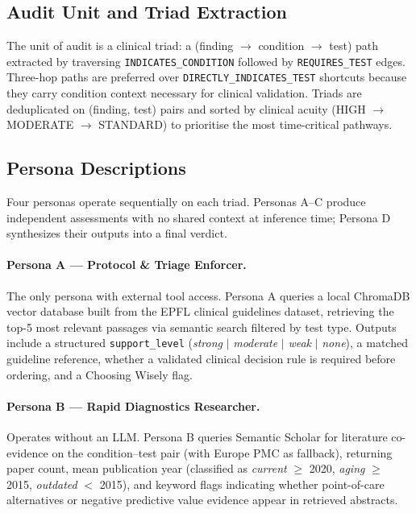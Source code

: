 \documentclass[pmlr]{jmlr}%
\begin{document}
\subsection*{Audit Unit and Triad Extraction}
The unit of audit is a clinical triad: a (finding $\rightarrow$ condition $\rightarrow$
test) path extracted by traversing \texttt{INDICATES\_CONDITION} followed by
\texttt{REQUIRES\_TEST} edges. Three-hop paths are preferred over
\texttt{DIRECTLY\_INDICATES\_TEST} shortcuts because they carry condition context
necessary for clinical validation. Triads are deduplicated on (finding, test) pairs and
sorted by clinical acuity (HIGH $\rightarrow$ MODERATE $\rightarrow$ STANDARD) to
prioritise the most time-critical pathways.

\subsection*{Persona Descriptions}
Four personas operate sequentially on each triad. Personas A--C produce independent
assessments with no shared context at inference time; Persona D synthesizes their outputs
into a final verdict.

\paragraph{Persona A — Protocol \& Triage Enforcer.}
The only persona with external tool access. Persona A queries a local ChromaDB vector database built from the EPFL clinical guidelines dataset, retrieving the top-5 most relevant passages via semantic search filtered by test type. Outputs include a structured \texttt{support\_level} (\textit{strong} $|$ \textit{moderate} $|$ \textit{weak} $|$ \textit{none}), a matched guideline reference, whether a validated clinical decision rule is required before ordering, and a Choosing Wisely flag.

\paragraph{Persona B — Rapid Diagnostics Researcher.}
Operates without an LLM. Persona B queries Semantic Scholar for literature co-evidence on the condition--test pair (with Europe PMC as fallback), returning paper count, mean publication year (classified as \textit{current} $\geq$ 2020, \textit{aging} $\geq$ 2015, \textit{outdated} $<$ 2015), and keyword flags indicating whether point-of-care alternatives or negative predictive value evidence appear in retrieved abstracts.
\end{document}
